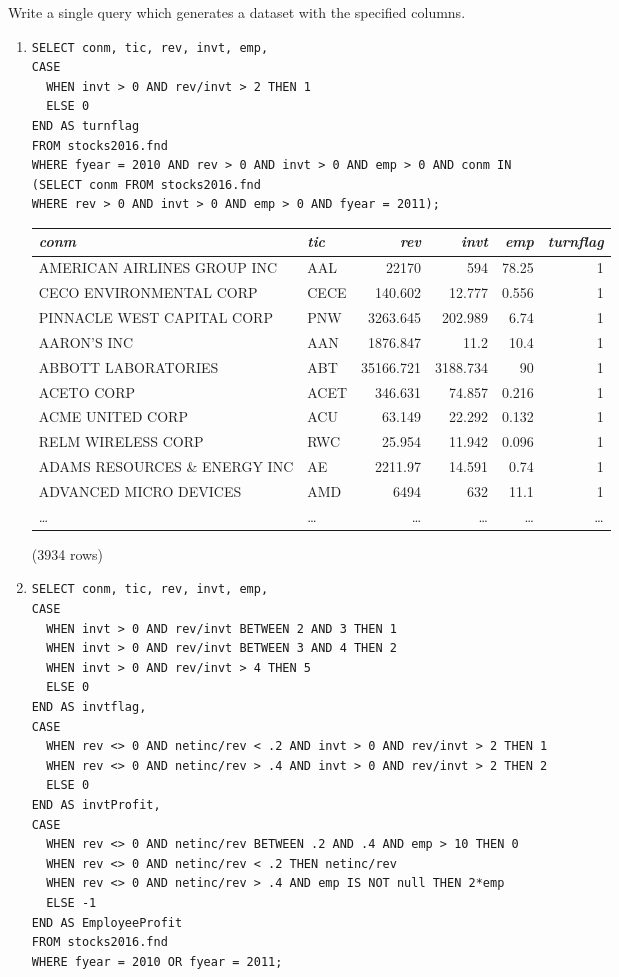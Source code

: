 \documentclass[]{article}
\newenvironment{question}[2][Question]{\begin{trivlist}
\item[\hskip \labelsep {\bfseries #1}\hskip \labelsep {\bfseries #2.}]}{\end{trivlist}}
\begin{document}
\begin{question}{3}
Write a single query which generates a dataset with the specified columns.
\begin{enumerate}[label=(\alph*)]
\item 
  \color{blue}
\begin{verbatim}
SELECT conm, tic, rev, invt, emp,
CASE
  WHEN invt > 0 AND rev/invt > 2 THEN 1
  ELSE 0
END AS turnflag
FROM stocks2016.fnd
WHERE fyear = 2010 AND rev > 0 AND invt > 0 AND emp > 0 AND conm IN
(SELECT conm FROM stocks2016.fnd
WHERE rev > 0 AND invt > 0 AND emp > 0 AND fyear = 2011);
  \end{verbatim}
\color{black}

\begin{center}
\begin{tabular}{l | l | r | r | r | r}
\textit{conm} & \textit{tic} & \textit{rev} & \textit{invt} & \textit{emp} & \textit{turnflag} \\
\hline
AMERICAN AIRLINES GROUP INC & AAL & 22170 & 594 & 78.25 & 1 \\
CECO ENVIRONMENTAL CORP & CECE & 140.602 & 12.777 & 0.556 & 1 \\
PINNACLE WEST CAPITAL CORP & PNW & 3263.645 & 202.989 & 6.74 & 1 \\
AARON'S INC & AAN & 1876.847 & 11.2 & 10.4 & 1 \\
ABBOTT LABORATORIES & ABT & 35166.721 & 3188.734 & 90 & 1 \\
ACETO CORP & ACET & 346.631 & 74.857 & 0.216 & 1 \\
ACME UNITED CORP & ACU & 63.149 & 22.292 & 0.132 & 1 \\
RELM WIRELESS CORP & RWC & 25.954 & 11.942 & 0.096 & 1 \\
ADAMS RESOURCES \& ENERGY INC & AE & 2211.97 & 14.591 & 0.74 & 1 \\
ADVANCED MICRO DEVICES & AMD & 6494 & 632 & 11.1 & 1 \\
\ldots & \ldots & \ldots & \ldots & \ldots & \ldots \\
\end{tabular}

\noindent (3934 rows) \\
\end{center}

\item 
  \color{blue}
\begin{verbatim}
SELECT conm, tic, rev, invt, emp,
CASE
  WHEN invt > 0 AND rev/invt BETWEEN 2 AND 3 THEN 1
  WHEN invt > 0 AND rev/invt BETWEEN 3 AND 4 THEN 2
  WHEN invt > 0 AND rev/invt > 4 THEN 5
  ELSE 0
END AS invtflag,
CASE
  WHEN rev <> 0 AND netinc/rev < .2 AND invt > 0 AND rev/invt > 2 THEN 1
  WHEN rev <> 0 AND netinc/rev > .4 AND invt > 0 AND rev/invt > 2 THEN 2
  ELSE 0
END AS invtProfit,
CASE
  WHEN rev <> 0 AND netinc/rev BETWEEN .2 AND .4 AND emp > 10 THEN 0
  WHEN rev <> 0 AND netinc/rev < .2 THEN netinc/rev
  WHEN rev <> 0 AND netinc/rev > .4 AND emp IS NOT null THEN 2*emp
  ELSE -1
END AS EmployeeProfit
FROM stocks2016.fnd
WHERE fyear = 2010 OR fyear = 2011;
  \end{verbatim}
\color{black}


\end{enumerate}
\end{question}
\end{document}
